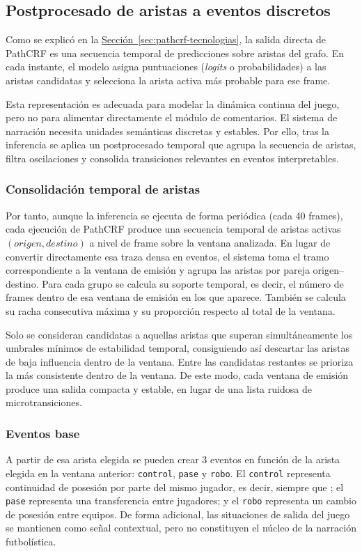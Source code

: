 \subsection{Postprocesado de aristas a eventos discretos}
Como se explicó en la \hyperref[sec:pathcrf-tecnologias]{Sección~\ref*{sec:pathcrf-tecnologias}}, la salida directa de PathCRF es una secuencia temporal de predicciones sobre aristas del grafo. En cada instante, el modelo asigna puntuaciones (\textit{logits} o probabilidades) a las aristas candidatas y selecciona la arista activa más probable para ese frame.

Esta representación es adecuada para modelar la dinámica continua del juego, pero no para alimentar directamente el módulo de comentarios. El sistema de narración necesita unidades semánticas discretas y estables. Por ello, tras la inferencia se aplica un postprocesado temporal que agrupa la secuencia de aristas, filtra oscilaciones y consolida transiciones relevantes en eventos interpretables.

\subsubsection{Consolidación temporal de aristas}
Por tanto, aunque la inferencia se ejecuta de forma periódica (cada 40 frames), cada ejecución de PathCRF produce una secuencia temporal de aristas activas \((origen,destino)\) a nivel de frame sobre la ventana analizada. En lugar de convertir directamente esa traza densa en eventos, el sistema toma el tramo correspondiente a la ventana de emisión y agrupa las aristas por pareja origen--destino. Para cada grupo se calcula su soporte temporal, es decir, el número de frames dentro de esa ventana de emisión en los que aparece. También se calcula su racha consecutiva máxima y su proporción respecto al total de la ventana.

Solo se consideran candidatas a aquellas aristas que superan simultáneamente los umbrales mínimos de estabilidad temporal, consiguiendo así descartar las aristas de baja influencia dentro de la ventana. Entre las candidatas restantes se prioriza la más consistente dentro de la ventana. De este modo, cada ventana de emisión produce una salida compacta y estable, en lugar de una lista ruidosa de microtransiciones.

\subsubsection{Eventos base}
A partir de esa arista elegida se pueden crear 3 eventos en función de la arista elegida en la ventana anterior: \texttt{control}, \texttt{pase} y \texttt{robo}. El \texttt{control} representa continuidad de posesión por parte del mismo jugador, es decir, siempre que ; el \texttt{pase} representa una transferencia entre jugadores; y el \texttt{robo} representa un cambio de posesión entre equipos. De forma adicional, las situaciones de salida del juego se mantienen como señal contextual, pero no constituyen el núcleo de la narración futbolística.

